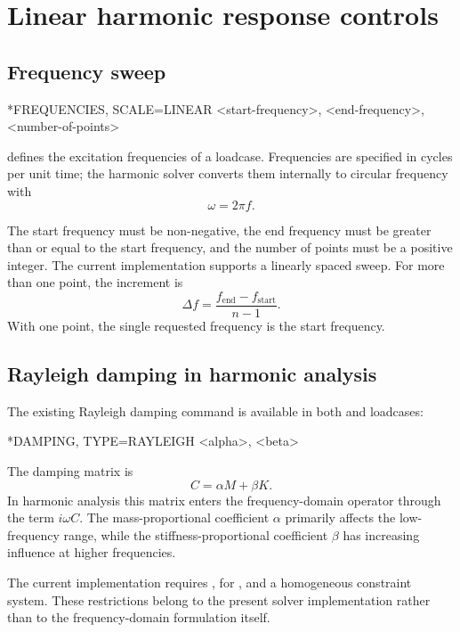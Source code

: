 \section{Linear harmonic response controls}
\label{sec:harmonic-controls}

\subsection{Frequency sweep}

\begin{syntax}
*FREQUENCIES, SCALE=LINEAR
<start-frequency>, <end-frequency>, <number-of-points>
\end{syntax}

 defines the excitation frequencies of a  loadcase. Frequencies are specified in cycles per unit time; the harmonic solver converts them internally to circular frequency with
\[
\omega = 2\pi f .
\]

The start frequency must be non-negative, the end frequency must be greater than or equal to the start frequency, and the number of points must be a positive integer. The current implementation supports a linearly spaced sweep. For more than one point, the increment is
\[
\Delta f = \frac{f_\mathrm{end}-f_\mathrm{start}}{n-1} .
\]
With one point, the single requested frequency is the start frequency.

\subsection{Rayleigh damping in harmonic analysis}

The existing Rayleigh damping command is available in both  and  loadcases:

\begin{syntax}
*DAMPING, TYPE=RAYLEIGH
<alpha>, <beta>
\end{syntax}

The damping matrix is
\[
C = \alpha M + \beta K .
\]
In harmonic analysis this matrix enters the frequency-domain operator through the term \(i\omega C\). The mass-proportional coefficient \(\alpha\) primarily affects the low-frequency range, while the stiffness-proportional coefficient \(\beta\) has increasing influence at higher frequencies.

\begin{warningbox}
The current  implementation requires ,  for , and a homogeneous constraint system. These restrictions belong to the present solver implementation rather than to the frequency-domain formulation itself.
\end{warningbox}
